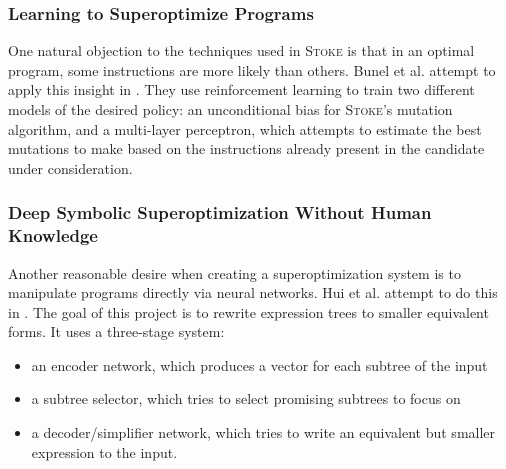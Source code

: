 \documentclass[12pt,twoside]{reedthesis}
\begin{document}
\subsubsection{Learning to Superoptimize Programs}
One natural objection to the techniques used in \textsc{Stoke} is that in an optimal program, some instructions are more likely than others.
Bunel et al. attempt to apply this insight in \cite{bunel2017learning}.
They use reinforcement learning to train two different models of the desired policy:
    an unconditional bias for \textsc{Stoke}'s mutation algorithm,
    and a multi-layer perceptron\footnotemark,
        which attempts to estimate the best mutations to make based on the instructions already present in the candidate under consideration.
    

\subsubsection{Deep Symbolic Superoptimization Without Human Knowledge}
Another reasonable desire when creating a superoptimization system is to manipulate programs directly via neural networks.
Hui et al. attempt to do this in \cite{hui2020deep}. 
The goal of this project is to rewrite expression trees to smaller equivalent forms. 
It uses a three-stage system:
\begin{itemize}
    \item an encoder network\footnotemark, which produces a vector for each subtree of the input
    \item a subtree selector, which tries to select promising subtrees to focus on
    \item a decoder/simplifier network, which tries to write an equivalent but smaller expression to the input.
\end{itemize}
    
    
\end{document}
